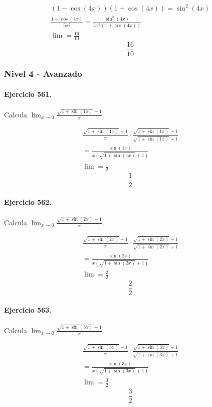 \documentclass[11pt,a4paper]{article}
\begin{document}
\[
\begin{aligned}
(1-\cos(4x))(1+\cos(4x))=\sin^2(4x)\\
\frac{1-\cos(4x)}{5x^2}=\frac{\sin^2(4x)}{5x^2(1+\cos(4x))}\\
\lim=\frac{16}{10}
\end{aligned}
\]
\[\boxed{\frac{16}{10}}\]


\newpage

\subsubsection*{Nivel 4 - Avanzado}

\paragraph{Ejercicio 561.} Calcula $\displaystyle\lim_{x\to0}\frac{\sqrt{1+\sin(1x)}-1}{x}$.

\[
\begin{aligned}
\frac{\sqrt{1+\sin(1x)}-1}{x}\cdot \frac{\sqrt{1+\sin(1x)}+1}{\sqrt{1+\sin(1x)}+1}\\
=\frac{\sin(1x)}{x(\sqrt{1+\sin(1x)}+1)}\\
\lim=\frac{1}{2}
\end{aligned}
\]
\[\boxed{\frac{1}{2}}\]


\paragraph{Ejercicio 562.} Calcula $\displaystyle\lim_{x\to0}\frac{\sqrt{1+\sin(2x)}-1}{x}$.

\[
\begin{aligned}
\frac{\sqrt{1+\sin(2x)}-1}{x}\cdot \frac{\sqrt{1+\sin(2x)}+1}{\sqrt{1+\sin(2x)}+1}\\
=\frac{\sin(2x)}{x(\sqrt{1+\sin(2x)}+1)}\\
\lim=\frac{2}{2}
\end{aligned}
\]
\[\boxed{\frac{2}{2}}\]


\paragraph{Ejercicio 563.} Calcula $\displaystyle\lim_{x\to0}\frac{\sqrt{1+\sin(3x)}-1}{x}$.

\[
\begin{aligned}
\frac{\sqrt{1+\sin(3x)}-1}{x}\cdot \frac{\sqrt{1+\sin(3x)}+1}{\sqrt{1+\sin(3x)}+1}\\
=\frac{\sin(3x)}{x(\sqrt{1+\sin(3x)}+1)}\\
\lim=\frac{3}{2}
\end{aligned}
\]
\[\boxed{\frac{3}{2}}\]
\end{document}
